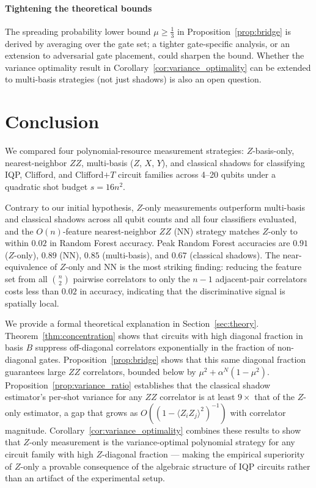 \documentclass[conference]{IEEEtran}
\newcommand{\nqubits}{n}
\newcommand{\shots}{s}
\begin{document}
\paragraph{Tightening the theoretical bounds}
The spreading probability lower bound $\mu \geq \frac{1}{3}$ in Proposition~\ref{prop:bridge} is derived by averaging over the gate set; a tighter gate-specific analysis, or an extension to adversarial gate placement, could sharpen the bound. Whether the variance optimality result in Corollary~\ref{cor:variance_optimality} can be extended to multi-basis strategies (not just shadows) is also an open question.

\section{Conclusion}
\label{sec:conclusion}

We compared four polynomial-resource measurement strategies: $Z$-basis-only, nearest-neighbor $ZZ$, multi-basis ($Z$, $X$, $Y$), and classical shadows for classifying IQP, Clifford, and Clifford$+T$ circuit families across 4--20 qubits under a quadratic shot budget $\shots = 16\nqubits^2$.

Contrary to our initial hypothesis, $Z$-only measurements outperform multi-basis and classical shadows across all qubit counts and all four classifiers evaluated, and the $O(\nqubits)$-feature nearest-neighbor $ZZ$ (NN) strategy matches $Z$-only to within $0.02$ in Random Forest accuracy.
Peak Random Forest accuracies are $0.91$ ($Z$-only), $0.89$ (NN), $0.85$ (multi-basis), and $0.67$ (classical shadows).
The near-equivalence of $Z$-only and NN is the most striking finding: reducing the feature set from all $\binom{\nqubits}{2}$ pairwise correlators to only the $\nqubits - 1$ adjacent-pair correlators costs less than $0.02$ in accuracy, indicating that the discriminative signal is spatially local.

We provide a formal theoretical explanation in Section~\ref{sec:theory}. Theorem~\ref{thm:concentration} shows that circuits with high diagonal fraction in basis $B$ suppress off-diagonal correlators exponentially in the fraction of non-diagonal gates. Proposition~\ref{prop:bridge} shows that this same diagonal fraction guarantees large $ZZ$ correlators, bounded below by $\mu^2 + \alpha^N(1-\mu^2)$. Proposition~\ref{prop:variance_ratio} establishes that the classical shadow estimator's per-shot variance for any $ZZ$ correlator is at least $9\times$ that of the $Z$-only estimator, a gap that grows as $O((1-\langle Z_iZ_j\rangle^2)^{-1})$ with correlator magnitude. Corollary~\ref{cor:variance_optimality} combines these results to show that $Z$-only measurement is the variance-optimal polynomial strategy for any circuit family with high $Z$-diagonal fraction --- making the empirical superiority of $Z$-only a provable consequence of the algebraic structure of IQP circuits rather than an artifact of the experimental setup.
\end{document}
